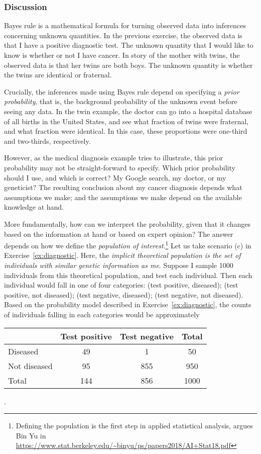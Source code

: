 \documentclass[11pt]{article}
\theoremstyle{definition}
\begin{document}
\subsubsection*{Discussion}

Bayes rule is a mathematical formula for turning observed data into
inferences concerning unknown quantities.
In the previous exercise, the observed data is that I have a positive diagnostic test.
The unknown quantity that I would like to know is whether or not I have cancer.
In story of the mother with twins, the observed data is that her
twins are both boys. The unknown quantity is whether the twins are identical or fraternal.

Crucially, the inferences made using Bayes rule depend on specifying a \textit{prior probability},
that is, the background probability of the unknown event before seeing any data.
In the twin example, the doctor can go into a hospital database of all births in the United States,
and see what fraction of twins were fraternal, and what fraction were identical.
In this case, these proportions were one-third and two-thirds, respectively.

However, as the medical diagnosis example tries to illustrate, this prior probability
may not be straight-forward to specify. Which prior probability should I use, and which is correct? My Google search, my doctor,
or my geneticist? The resulting conclusion about my cancer diagnosis
depends what assumptions we make; and the assumptions we make depend
on the available knowledge at hand.

More fundamentally, how can we interpret the
probability, given that it changes based on the
information at hand or based on expert opinion?
The answer depends on how we define the \textit{population
of interest}.\footnote{
Defining the population is the
first step in applied statistical analysis,
argues Bin Yu in
\url{https://www.stat.berkeley.edu/~binyu/ps/papers2018/AI+Stat18.pdf}
}
Let us take scenario (c) in Exercise~\ref{ex:diagnostic}.
Here, the \textit{implicit theoretical population is the set of
individuals with similar genetic information as me}.
Suppose I sample 1000 individuals from this theoretical
population, and test each individual.
Then each individual would fall in one of four categories:
(test positive, diseased); (test positive, not diseased);
(test negative, diseased); (test negative, not diseased).
Based on the probability model described in
Exercise~\ref{ex:diagnostic}, the counts
of individuals falling in each categories would be
approximately
\begin{table}[!h]
  \centering
  \begin{tabular}{l|cc|c}
    & Test positive & Test negative & Total \\\hline
  Diseased & 49 & 1 & 50 \\
  Not diseased & 95 & 855 & 950\\ \hline
  Total & 144 & 856 & 1000
  \end{tabular}
\end{table}.
\end{document}
